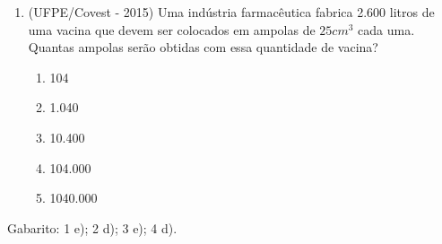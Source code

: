 \begin{enumerate}
\item (UFPE/Covest - 2015) Uma indústria farmacêutica fabrica 2.600 litros de uma vacina que devem ser colocados em ampolas de $25 cm^3$ cada uma. Quantas ampolas serão obtidas com essa quantidade de vacina?
\begin{enumerate}
\item 104
\item 1.040
\item 10.400
\item 104.000
\item 1040.000
\end{enumerate}
\end{enumerate}
Gabarito: 1 e); 2 d); 3 e); 4 d).

